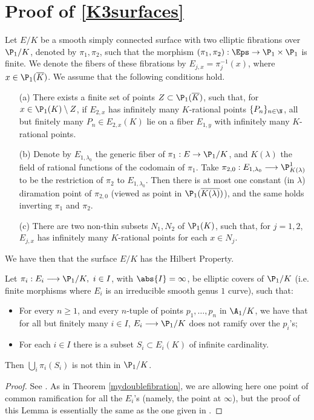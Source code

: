 \section{Proof of \ref{K3surfaces}}
\begin{theorem}\label{mydoublefibration}
	Let $E/K$ be a smooth simply connected surface with two elliptic fibrations over $\P_1/K$, denoted by $\pi_1,\pi_2$, such that the morphism $(\pi_1,\pi_2):\Eps \rightarrow \P_1 \times \P_1$ is finite. We denote the fibers of these fibrations by  $E_{j,x}=\pi_j^{-1}(x)$, where $x \in \P_1(\overline{K})$. We assume that the following conditions hold.
	\begin{itemize}
		\item[(a)] There exists a finite set of points $Z \subset \P_1(\overline{K})$, such that, for $x \in \P_1(K)\setminus Z$, if $E_{2,x}$ has infinitely many $K$-rational points $\{P_n\}_{n \in \N}$, all but finitely many $P_n \in E_{2,x}(K)$ lie on a fiber $E_{1,y}$ with infinitely many $K$-rational points.
		\item[(b)] Denote by $E_{1,\lambda_0}$ the generic fiber of $\pi_1:E \rightarrow \P_1/K$, and $K(\lambda)$ the field of rational functions of the codomain of $\pi_1$. Take $\pi_{2,0}:E_{1,\lambda_0}\longrightarrow \P_{K(\lambda)}^1$ to be the restriction of $\pi_2$ to $E_{1,\lambda_0}$. Then there is at most one constant (in $\lambda$) diramation point of $\pi_{2,0}$ (viewed as point in $\P_1(\overline{{K(\lambda)}})$), and the same holds inverting $\pi_1$ and $\pi_2$.
		\item[(c)] There are two non-thin subsets $N_1,N_2$ of $\P_1(K)$, such that, for $j=1,2$, $E_{j,x}$ has infinitely many $K$-rational points for each $x \in N_j$.
	\end{itemize} 
	We have then that the surface $E/K$ has the Hilbert Property.
\end{theorem}



\begin{lemma}\label{ellipticnotthin}
	Let $\pi_i:E_{i}\longrightarrow \P_1/K, \ i\in I$, with $\abs{I}=\infty$,  be elliptic covers of $\P_1/K$ (i.e. finite morphisms where $E_i$ is an irreducible smooth genus $1$ curve), such that: 
	\begin{itemize}
		\item For every $n \geq 1$, and every $n$-tuple of points $p_1, \dots, p_n$ in $\A_1/K$, we have that for all but finitely many $i\in I$, $E_i \longrightarrow \P_1/K$ does not ramify over the $p_i$'s;
		\item For each $i \in I$ there is a subset $S_i \subset E_i(K)$ of infinite cardinality.
	\end{itemize}
	Then $\bigcup_i \pi_i(S_i)$ is not thin in $\P_1/K$. 
\end{lemma}
\begin{proof}
	See \cite{myarticle1}. As in Theorem \ref{mydoublefibration}, we are allowing here one point of common ramification for all the $E_i$'s (namely, the point at $\infty$), but the proof of this Lemma is essentially the same as the one given in \cite{myarticle1}. 
\end{proof}


